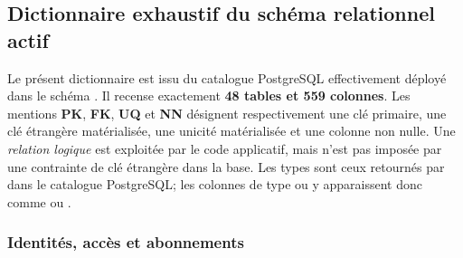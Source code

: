 \subsection{Dictionnaire exhaustif du schéma relationnel actif}
\label{subsec-dictionnaire-schema-actif}

Le présent dictionnaire est issu du catalogue PostgreSQL effectivement déployé dans le schéma . Il recense exactement \textbf{48 tables et 559 colonnes}. Les mentions \textbf{PK}, \textbf{FK}, \textbf{UQ} et \textbf{NN} désignent respectivement une clé primaire, une clé étrangère matérialisée, une unicité matérialisée et une colonne non nulle. Une \emph{relation logique} est exploitée par le code applicatif, mais n'est pas imposée par une contrainte de clé étrangère dans la base. Les types sont ceux retournés par  dans le catalogue PostgreSQL; les colonnes de type  ou  y apparaissent donc comme  ou .

\begingroup
\scriptsize
\setlength{\LTleft}{0pt}
\setlength{\LTright}{0pt}
\setlength{\tabcolsep}{4pt}

\subsubsection{Identités, accès et abonnements}

